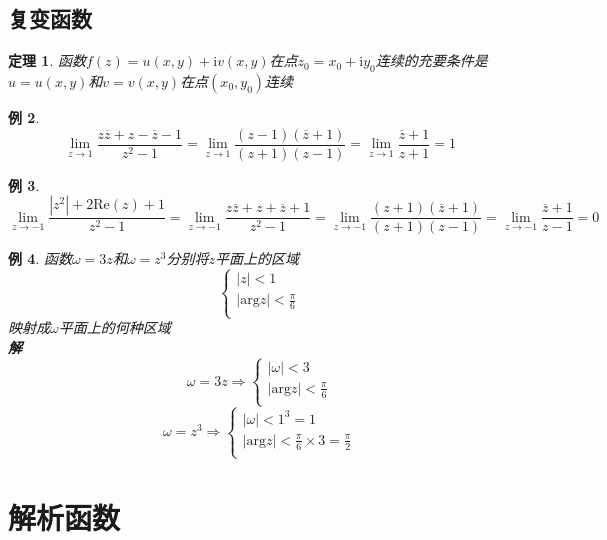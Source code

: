 \documentclass[12pt, a4paper, twoside]{ctexbook}
\newtheorem{theorem}{定理}[section]
\newtheorem{example}[theorem]{例}
\begin{document}
\section{复变函数}
\begin{theorem}
	函数$f\left(z\right)=u\left(x,y\right)+\mathrm{i}v\left(x,y\right)$在点$z_0=x_0+\mathrm{i}y_0$连续的充要条件是$u=u\left(x,y\right)$和$v=v\left(x,y\right)$在点$\left(x_0,y_0\right)$连续
\end{theorem}
\begin{example}
	$$
	\lim_{z\to1}\frac{z\overline{z}+z-\overline{z}-1}{z^2-1}=\lim_{z\to 1}\frac{\left(z-1\right)\left(\overline{z}+1\right)}{\left(z+1\right)\left(z-1\right)}=\lim_{z\to 1}\frac{\overline{z}+1}{z+1}=1
	$$
\end{example}
\begin{example}
	$$
	\lim_{z\to -1}\frac{\left|z^2\right|+2\mathrm{Re}\left(z\right)+1}{z^2-1}=\lim_{z\to -1}\frac{z\overline{z}+z+\overline{z}+1}{z^2-1}=\lim_{z\to -1}\frac{\left(z+1\right)\left(\overline{z}+1\right)}{\left(z+1\right)\left(z-1\right)}=\lim_{z\to -1}\frac{\overline{z}+1}{z-1}=0
	$$
\end{example}
\begin{example}
	函数$\omega=3z$和$\omega=z^3$分别将$z$平面上的区域
	$$
	\left\{ \begin{array}{l}
		\left| z \right|<1\\
		\left| \mathrm{arg}z \right|<\frac{\pi}{6}\\
	\end{array} \right. 
	$$
	\hspace*{2em}映射成$\omega$平面上的何种区域\\
	\hspace*{1em}\textbf{解}
	\hspace*{2em}
	$$
	\omega=3z\Rightarrow\left\{ \begin{array}{l}
		\left| \omega \right|<3\\
		\left| \mathrm{arg}z \right|<\frac{\pi}{6}\\
	\end{array} \right. 
	$$
	$$
	\omega=z^3 \Rightarrow\left\{ \begin{array}{l}
		\left| \omega \right|<1^3=1\\
		\left| \mathrm{arg}z \right|<\frac{\pi}{6}\times 3=\frac{\pi}{2}\\
	\end{array} \right. 
	$$
\end{example}

\chapter{解析函数}
\newpage
\end{document}
